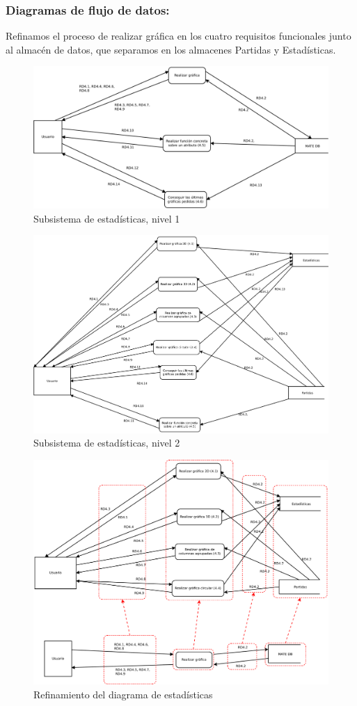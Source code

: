 \subsubsection{Diagramas de flujo de datos:}

Refinamos el proceso de realizar gráfica en los cuatro requisitos funcionales junto al almacén de datos, que separamos en los almacenes Partidas y Estadísticas.
 
 
 \begin{figure}[h!]
 	\centering
 	\includegraphics[width=0.7\linewidth]{../Diagramas/pdf/DiagramaEstadistica1.pdf}
 	\caption{Subsistema de estadísticas, nivel 1}
 	\label{fig:RefinamientoEstadisticas1}
 \end{figure}
 
 
 \begin{figure}[h!]
 	\centering
 	\includegraphics[width=0.7\linewidth]{../Diagramas/pdf/DiagramaEstadistica2.pdf}
 	\caption{Subsistema de estadísticas, nivel 2}
 	\label{fig:RefinamientoEstadisticas2}
 \end{figure}
 
 
\begin{figure}[H]
\centering
\includegraphics[width=0.7\linewidth]{../Diagramas/pdf/RefinamientoEstadisticas.pdf}
\caption{Refinamiento del diagrama de estadísticas}
\label{fig:RefinamientoEstadisticas}
\end{figure}


